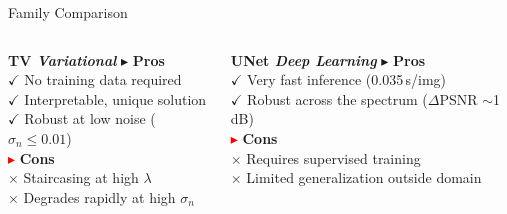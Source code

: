 \documentclass[english,10pt]{beamer}
\begin{document}
\begin{frame}{Family Comparison}
  \begin{columns}[t]
      {%
      \begin{block}{\small\bfseries TV  \hfill \scriptsize\itshape Variational}
        \scriptsize
        \textcolor{green!50!black}{$\blacktriangleright$} \textbf{Pros}\\[0.05cm]
        \hspace{0.3cm}$\checkmark$ No training data required\\
        \hspace{0.3cm}$\checkmark$ Interpretable, unique solution\\
        \hspace{0.3cm}$\checkmark$ Robust at low noise ($\sigma_n \leq 0.01$)\\[0.08cm]
        \textcolor{red}{$\blacktriangleright$} \textbf{Cons}\\[0.05cm]
        \hspace{0.3cm}$\times$ Staircasing at high $\lambda$\\
        \hspace{0.3cm}$\times$ Degrades rapidly at high $\sigma_n$
      \end{block}}

      {%
      \begin{block}{\small\bfseries UNet  \hfill \scriptsize\itshape Deep Learning}
        \scriptsize
        \textcolor{green!50!black}{$\blacktriangleright$} \textbf{Pros}\\[0.05cm]
        \hspace{0.3cm}$\checkmark$ Very fast inference (0.035\,s/img)\\
        \hspace{0.3cm}$\checkmark$ Robust across the spectrum ($\Delta$PSNR $\sim$1\,dB)\\[0.08cm]
        \textcolor{red}{$\blacktriangleright$} \textbf{Cons}\\[0.05cm]
        \hspace{0.3cm}$\times$ Requires supervised training\\
        \hspace{0.3cm}$\times$ Limited generalization outside domain
      \end{block}}
  \end{columns}


\end{frame}
\end{document}
